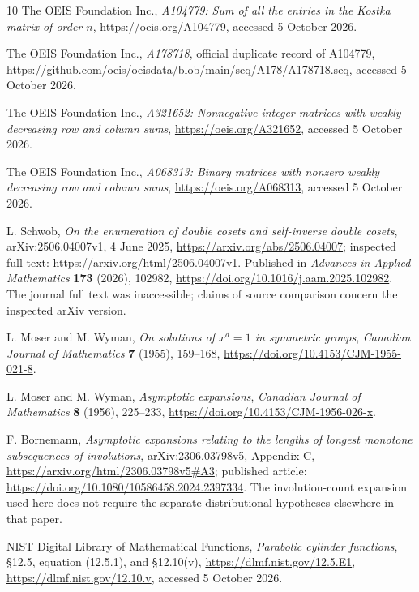 \begin{thebibliography}{10}
The OEIS Foundation Inc., \emph{A104779: Sum of all the entries in the Kostka matrix of order $n$},
\url{https://oeis.org/A104779}, accessed 5 October 2026.

The OEIS Foundation Inc., \emph{A178718}, official duplicate record of A104779,
\url{https://github.com/oeis/oeisdata/blob/main/seq/A178/A178718.seq}, accessed 5 October 2026.

The OEIS Foundation Inc., \emph{A321652: Nonnegative integer matrices with weakly decreasing row and column sums},
\url{https://oeis.org/A321652}, accessed 5 October 2026.

The OEIS Foundation Inc., \emph{A068313: Binary matrices with nonzero weakly decreasing row and column sums},
\url{https://oeis.org/A068313}, accessed 5 October 2026.

L. Schwob, \emph{On the enumeration of double cosets and self-inverse double cosets},
arXiv:2506.04007v1, 4 June 2025,
\url{https://arxiv.org/abs/2506.04007}; inspected full text:
\url{https://arxiv.org/html/2506.04007v1}.
Published in \emph{Advances in Applied Mathematics} \textbf{173} (2026), 102982,
\url{https://doi.org/10.1016/j.aam.2025.102982}.
The journal full text was inaccessible; claims of source comparison concern the inspected arXiv version.

L. Moser and M. Wyman, \emph{On solutions of $x^d=1$ in symmetric groups},
\emph{Canadian Journal of Mathematics} \textbf{7} (1955), 159--168,
\url{https://doi.org/10.4153/CJM-1955-021-8}.

L. Moser and M. Wyman, \emph{Asymptotic expansions},
\emph{Canadian Journal of Mathematics} \textbf{8} (1956), 225--233,
\url{https://doi.org/10.4153/CJM-1956-026-x}.

F. Bornemann, \emph{Asymptotic expansions relating to the lengths of longest monotone subsequences of involutions},
arXiv:2306.03798v5, Appendix C,
\url{https://arxiv.org/html/2306.03798v5#A3};
published article: \url{https://doi.org/10.1080/10586458.2024.2397334}.
The involution-count expansion used here does not require the separate distributional hypotheses elsewhere in that paper.

NIST Digital Library of Mathematical Functions, \emph{Parabolic cylinder functions},
\S12.5, equation (12.5.1), and \S12.10(v),
\url{https://dlmf.nist.gov/12.5.E1},
\url{https://dlmf.nist.gov/12.10.v}, accessed 5 October 2026.


\end{thebibliography}
